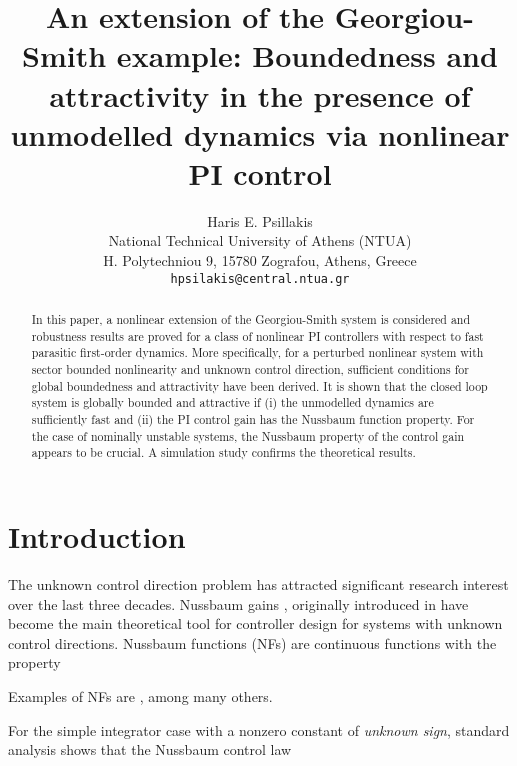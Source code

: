 \documentclass[preprint,12pt]{article}
\begin{document}
\title{An extension of the Georgiou-Smith example: Boundedness and attractivity  in the presence of unmodelled dynamics via nonlinear PI control}



\author{Haris E. Psillakis\\
National Technical University of Athens (NTUA)\\
H. Polytechniou 9,
15780 Zografou, Athens, Greece\\
\texttt{hpsilakis@central.ntua.gr}}
\date{}
\maketitle
\begin{abstract}
In this paper, a nonlinear extension of the Georgiou-Smith system is considered and robustness results are proved for a class of nonlinear PI controllers with respect to fast parasitic first-order dynamics. More specifically, for a perturbed nonlinear system with sector bounded nonlinearity and unknown control direction, sufficient conditions for global boundedness and attractivity have been derived. It is shown that  the closed loop system is globally bounded and attractive if (i) the unmodelled dynamics are sufficiently fast and (ii) the PI  control gain has the Nussbaum function property. For the case of nominally unstable systems, the Nussbaum  property of the control gain appears to be crucial. A simulation study confirms the theoretical results.
\end{abstract}

\section{Introduction}
\label{intro}
\newtheorem{theorem}{Theorem}
\newtheorem{lemma}{Lemma}
\newtheorem{remark}{Remark}
\newtheorem{definition}{Definition}
\newtheorem{assumption}{Assumption}
\newtheorem{corollary}{Corollary}
The unknown control direction problem has attracted significant research interest over the last three decades. Nussbaum gains \cite{Nussbaum_paper}, \cite{Ye_Jiang98} originally introduced in \cite{Nussbaum_paper} have become the main theoretical tool for controller design for systems with unknown control directions.
Nussbaum functions (NFs) are continuous functions  with the property

Examples of NFs are ,  among many others.

For the simple integrator case  with  a nonzero constant of \emph{unknown sign}, standard analysis \cite{Nussbaum_paper} shows that the Nussbaum control law
\end{document}
